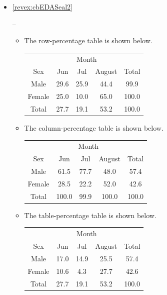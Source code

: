 \documentclass[10pt,openany]{book}\usepackage[]{graphicx}\usepackage[]{color}
\begin{document}
\begin{itemize}
  \item \hypertarget{ans:cbEDASeal2}{\ref{revex:cbEDASeal2}} --
    \begin{itemize}
      \item The row-percentage table is shown below.
         \begin{center}
          \begin{tabular}{c|ccc|c}
            \hline\hline
            \multicolumn{1}{c}{} & \multicolumn{3}{c}{Month} &  \\
            \cline{2-4}
            \multicolumn{1}{c}{Sex} & Jun & Jul & \multicolumn{1}{c}{August} & Total \\
            \hline
            Male & 29.6 & 25.9 & 44.4 & 99.9 \\
            Female & 25.0 & 10.0 & 65.0 & 100.0 \\
            \hline
            Total & 27.7 & 19.1 & 53.2 & 100.0 \\
            \hline\hline
          \end{tabular}
        \end{center}
      \item The column-percentage table is shown below.
         \begin{center}
          \begin{tabular}{c|ccc|c}
            \hline\hline
            \multicolumn{1}{c}{} & \multicolumn{3}{c}{Month} &  \\
            \cline{2-4}
            \multicolumn{1}{c}{Sex} & Jun & Jul & \multicolumn{1}{c}{August} & Total \\
            \hline
            Male & 61.5 & 77.7 & 48.0 & 57.4 \\
            Female & 28.5 & 22.2 & 52.0 & 42.6 \\
            \hline
            Total & 100.0 & 99.9 & 100.0 & 100.0 \\
            \hline\hline
          \end{tabular}
        \end{center}
      \item The table-percentage table is shown below.
         \begin{center}
          \begin{tabular}{c|ccc|c}
            \hline\hline
            \multicolumn{1}{c}{} & \multicolumn{3}{c}{Month} &  \\
            \cline{2-4}
            \multicolumn{1}{c}{Sex} & Jun & Jul & \multicolumn{1}{c}{August} & Total \\
            \hline
            Male & 17.0 & 14.9 & 25.5 & 57.4 \\
            Female & 10.6 & 4.3 & 27.7 & 42.6 \\
            \hline
            Total & 27.7 & 19.1 & 53.2 & 100.0 \\
            \hline\hline
          \end{tabular}
        \end{center}
    \end{itemize}


\end{itemize}
\end{document}
